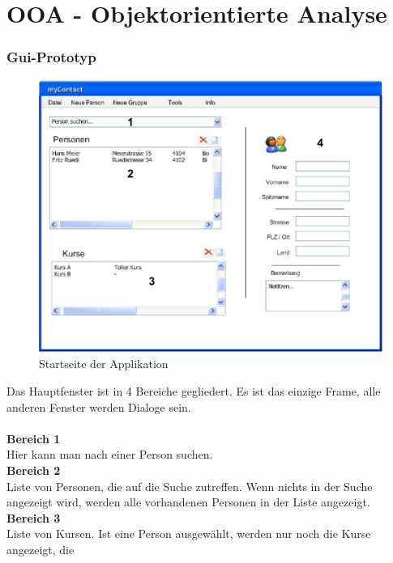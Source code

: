 \part{OOA - Objektorientierte Analyse}
\newpage
\section{Gui-Prototyp}
%
\begin{figure}[ht]
\begin{center}
\includegraphics[width=15cm]{images/main.png}
\caption{Startseite der Applikation}
\end{center}
\end{figure}
%
Das Hauptfenster ist in 4 Bereiche gegliedert. Es ist das einzige Frame, alle anderen
Fenster werden Dialoge sein.\\
\\
\textbf{Bereich 1}\\
Hier kann man nach einer Person suchen.
\\[2ex]
\textbf{Bereich 2}\\
Liste von Personen, die auf die Suche zutreffen. Wenn nichts in der Suche angezeigt wird,
werden alle vorhandenen Personen in der Liste angezeigt.
\\[2ex]
\textbf{Bereich 3}\\
Liste von Kursen. Ist eine Person ausgewählt, werden nur noch die Kurse angezeigt, die
